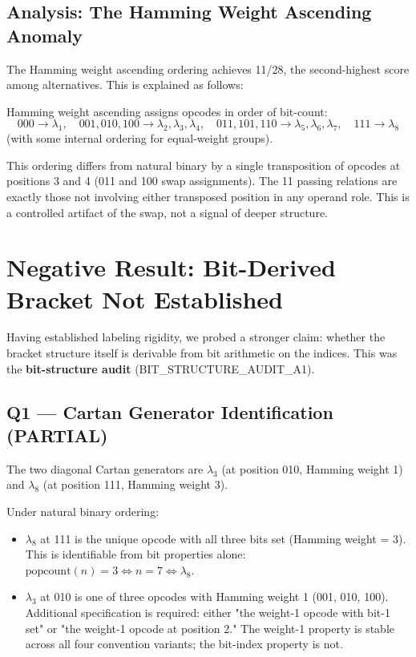 \documentclass[11pt,a4paper]{article}
\begin{document}
\subsection{Analysis: The Hamming Weight Ascending Anomaly}

The Hamming weight ascending ordering achieves 11/28, the second-highest score among alternatives. This is explained as follows:

Hamming weight ascending assigns opcodes in order of bit-count:
\begin{equation}
000 \to \lambda_1, \quad 001, 010, 100 \to \lambda_2, \lambda_3, \lambda_4, \quad 011, 101, 110 \to \lambda_5, \lambda_6, \lambda_7, \quad 111 \to \lambda_8
\end{equation}
(with some internal ordering for equal-weight groups).

This ordering differs from natural binary by a single transposition of opcodes at positions 3 and 4 (011 and 100 swap assignments). The 11 passing relations are exactly those not involving either transposed position in any operand role. This is a controlled artifact of the swap, not a signal of deeper structure.

\section{Negative Result: Bit-Derived Bracket Not Established}\label{sec:bitaudit}

Having established labeling rigidity, we probed a stronger claim: whether the bracket structure itself is derivable from bit arithmetic on the indices. This was the \textbf{bit-structure audit} (BIT\_STRUCTURE\_AUDIT\_A1).

\subsection{Q1 — Cartan Generator Identification (PARTIAL)}

The two diagonal Cartan generators are $\lambda_3$ (at position 010, Hamming weight 1) and $\lambda_8$ (at position 111, Hamming weight 3).

Under natural binary ordering:
\begin{itemize}
  \item $\lambda_8$ at 111 is the unique opcode with all three bits set (Hamming weight = 3). This is identifiable from bit properties alone: $\text{popcount}(n) = 3 \iff n = 7 \iff \lambda_8$.

  \item $\lambda_3$ at 010 is one of three opcodes with Hamming weight 1 (001, 010, 100). Additional specification is required: either "the weight-1 opcode with bit-1 set" or "the weight-1 opcode at position 2." The weight-1 property is stable across all four convention variants; the bit-index property is not.
\end{itemize}
\end{document}
